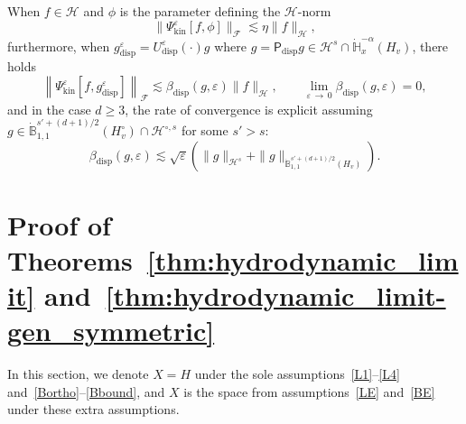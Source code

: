\documentclass[AHL,Unicode,longabstracts,published]{cedram}
\newcommand{\kin}{\mathrm{kin}}
\newcommand{\disp}{\mathrm{disp}}
\newcommand{\bbH}{\mathbb{H}}
\newcommand{\bbB}{\mathbb{B}}
\newcommand{\HH}{\mathcal{H}}
\newcommand{\PP}{\mathsf{P}}
\newcommand{\FFF}{\mathscr{F}}
\newcommand{\HHH}{\mathscr{H}}
\newcommand{\Ss}{H}
\newcommand{\Ssm}{H^{\circ}}
\newcommand{\rSSs}[1]{\HH^{#1}}
\newcommand{\rSSsm}[1]{\HH^{{\circ}, #1}}
\newcommand{\SSSs}{\HHH}
\newcommand{\Sl}{X}
\newcommand{\SSSm}{\FFF}
\renewcommand*\ge{\geqslant}
\newcommand*\eps{{\varepsilon}}
\begin{document}
\begin{prop}\label{prop:special_bilinear_mix}
When $f \in \SSSs$ and $\phi$ is the parameter defining the $\SSSs$-norm
\begin{equation}\label{eq:bilinear_mix_phi}
\| \Psi^\eps_\kin [f, \phi] \|_\SSSm \lesssim \eta \| f \|_\SSSs,
\end{equation}
furthermore, when $g^\eps_\disp = U^\eps_\disp(\cdot) g$ where $g = \PP_{\disp} g \in \rSSs{s} \cap \dot{\bbH}^{-\alpha}_x (\Ss_v)$, there holds
\begin{equation}\label{eq:bilinear_mix_disp}
\left\| \Psi^\eps_\kin \left[f, g^\eps_\disp\right] \right\|_\SSSm \lesssim {\beta_{\disp}}(g, \eps) \| f \|_{ \SSSs }, \qquad \lim_{\eps\,\to\,0} {\beta_{\disp}}(g, \eps)=0,
\end{equation}
and in the case $d \ge 3$, the rate of convergence is explicit assuming $g \in \dot{\bbB}^{s' + (d+1)/2}_{1, 1} (\Ssm_v) \cap \rSSsm{s}$ for some $s'>s$:
\begin{equation*}
{\beta_{\disp}}(g, \eps) \lesssim \sqrt{\eps} \left(\| g \|_{ \rSSs{s} } + \| g \|_{ \dot{\bbB}^{s' + (d+1)/2 }_{1, 1} \left(\Ss_v \right) }\right).
\end{equation*}
\end{prop}


\section{Proof of Theorems~\ref{thm:hydrodynamic_limit} and~\ref{thm:hydrodynamic_limit-gen_symmetric}}
\label{scn:proof_hydrodynamic_limit_symmetrizable}

In this section, we denote $\Sl = \Ss$ under the sole assumptions~\eqref{L1}--\eqref{L4} and~\eqref{Bortho}--\eqref{Bbound}, and $\Sl$ is the space from assumptions~\eqref{LE} and~\eqref{BE} under these extra assumptions.
\end{document}
